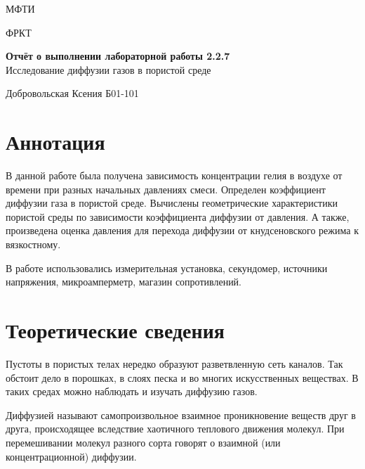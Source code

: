 \documentclass[a4paper,12pt]{article}
\date{\today}
\begin{document}
\begin{titlepage}
	\begin{center}
		{\large МФТИ}
	\end{center}
	\begin{center}
		{\large ФРКТ}
	\end{center}
	
	
	\vspace{4.5cm}
	{\huge
		\begin{center}
			{\bf Отчёт о выполнении лабораторной работы 2.2.7}\\
			Исследование диффузии газов в пористой среде

		\end{center}
	}
	\vspace{9cm}
	\begin{flushright}
		{\LARGE  Добровольская Ксения 
			\vspace{0.2cm}
			Б01-101}
	\end{flushright}
	\vspace{8cm}
	
\end{titlepage}

\section{Аннотация}

В данной работе была получена зависимость концентрации гелия в воздухе от времени при разных начальных давлениях смеси. Определен коэффициент диффузии газа в пористой среде. Вычислены геометрические характеристики пористой среды по зависимости коэффициента диффузии от давления. А также, произведена оценка давления для перехода диффузии от кнудсеновского режима к вязкостному.

В работе использовались измерительная установка, секундомер, источники напряжения, микроамперметр, магазин сопротивлений.

\section{Теоретические сведения}


Пустоты в пористых телах нередко образуют разветвленную сеть каналов. Так обстоит дело в порошках, в слоях песка и во многих искусственных веществах. В таких средах можно наблюдать и изучать диффузию газов.

Диффузией называют самопроизвольное взаимное проникновение веществ друг в друга, происходящее вследствие хаотичного теплового движения молекул. При перемешивании молекул разного сорта говорят о взаимной (или концентрационной) диффузии.
\end{document}

